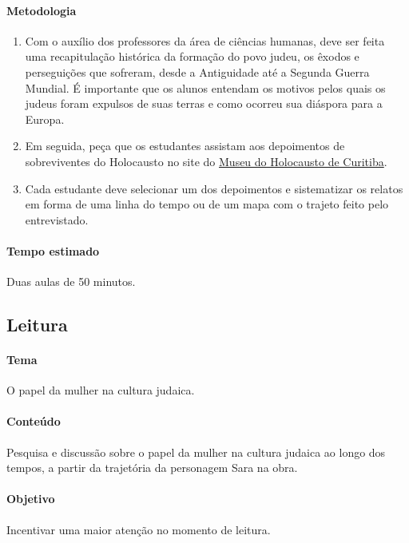 \documentclass[12pt]{extarticle}
\begin{document}
\paragraph{Metodologia}

\begin{enumerate}

\item Com o auxílio dos professores da área de ciências humanas,
deve ser feita uma recapitulação histórica da formação do povo judeu, os êxodos e perseguições
que sofreram, desde a Antiguidade até a Segunda Guerra Mundial. É importante que os alunos entendam os motivos pelos quais os judeus foram expulsos de suas terras e como ocorreu sua diáspora para a Europa. 

\item Em seguida, peça que os estudantes assistam aos depoimentos de sobreviventes do Holocausto no site do \href{https://www.museudoholocausto.org.br/depoimentos/}{Museu do Holocausto de Curitiba}.

\item Cada estudante deve selecionar um dos depoimentos e sistematizar os relatos em forma de uma linha do tempo ou de um mapa com o trajeto feito pelo entrevistado.

\end{enumerate}

\paragraph{Tempo estimado} Duas aulas de 50 minutos.


\subsection{Leitura}


\paragraph{Tema} O papel da mulher na cultura judaica.

\paragraph{Conteúdo} Pesquisa e discussão sobre
o papel da mulher na cultura judaica ao longo dos tempos, 
a partir da trajetória da personagem Sara na obra.

\paragraph{Objetivo} Incentivar uma maior atenção no momento de leitura.
\end{document}
